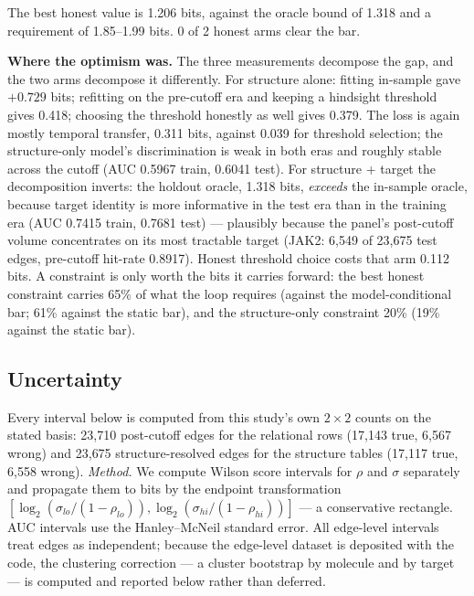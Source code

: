 \documentclass[11pt]{article}
\begin{document}
The best honest value is 1.206 bits, against the oracle bound of 1.318 and a
requirement of 1.85--1.99 bits. 0 of 2 honest arms clear the bar.

\textbf{Where the optimism was.} The three measurements decompose the gap,
and the two arms decompose it differently. For structure alone: fitting
in-sample gave $+0.729$ bits; refitting on the pre-cutoff era and
keeping a hindsight threshold gives 0.418; choosing the threshold
honestly as well gives 0.379. The loss is again mostly temporal
transfer, 0.311 bits, against 0.039 for threshold selection; the
structure-only model's discrimination is weak in both eras and roughly
stable across the cutoff (AUC 0.5967 train, 0.6041 test). For
structure + target the decomposition inverts: the holdout oracle,
1.318 bits, \emph{exceeds} the in-sample oracle, because target
identity is more informative in the test era than in the training era
(AUC 0.7415 train, 0.7681 test) --- plausibly because the panel's
post-cutoff volume concentrates on its most tractable target (JAK2:
6{,}549 of 23{,}675 test edges, pre-cutoff hit-rate
0.8917). Honest threshold choice costs that arm 0.112 bits. A
constraint is only worth the bits it carries forward: the best honest
constraint carries 65\% of what the loop requires (against the
model-conditional bar; 61\% against the static bar), and the
structure-only constraint 20\% (19\% against the static bar).

\subsection{Uncertainty}

Every interval below is computed from this study's own $2 \times 2$ counts
on the stated basis: 23{,}710 post-cutoff edges for the relational rows
(17{,}143 true, 6{,}567 wrong) and 23{,}675 structure-resolved edges
for the structure tables (17{,}117 true, 6{,}558 wrong). \emph{Method.} We
compute Wilson score intervals for $\rho$ and $\sigma$ separately and
propagate them to bits by the endpoint transformation
$[\log_2(\sigma_{lo}/(1-\rho_{lo})), \log_2(\sigma_{hi}/(1-\rho_{hi}))]$ --- a
conservative rectangle. AUC intervals use the Hanley--McNeil standard
error. All edge-level intervals treat edges as independent; because the
edge-level dataset is deposited with the code, the clustering correction
--- a cluster bootstrap by molecule and by target --- is computed and
reported below rather than deferred.
\end{document}
